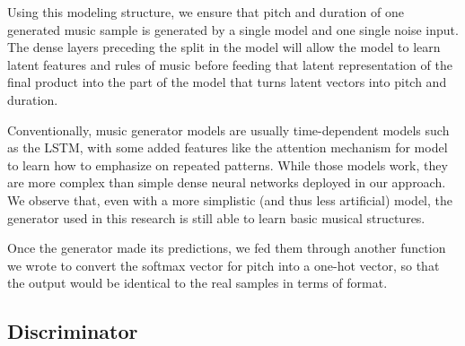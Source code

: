 \documentclass[12pt,oneside]{chicagocapstone}
\begin{document}
Using this modeling structure, we ensure that pitch and duration of one generated music sample is generated by a single model and one single noise input. The dense layers preceding the split in the model will allow the model to learn latent features and rules of music before feeding that latent representation of the final product into the part of the model that turns latent vectors into pitch and duration.

Conventionally, music generator models are usually time-dependent models such as the LSTM, with some added features like the attention mechanism for model to learn how to emphasize on repeated patterns. While those models work, they are more complex than simple dense neural networks deployed in our approach. We observe that, even with a more simplistic (and thus less artificial) model, the generator used in this research is still able to learn basic musical structures.

Once the generator made its predictions, we fed them through another function we wrote to convert the softmax vector for pitch into a one-hot vector, so that the output would be identical to the real samples in terms of format.

\hypertarget{discriminator}{%
\subsection*{Discriminator}\label{discriminator}}
\end{document}
